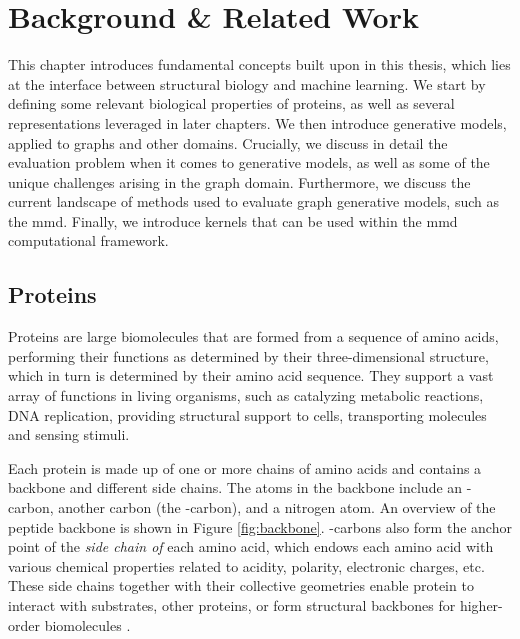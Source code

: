 
\chapter{Background \& Related Work}\label{chap:background}



This chapter introduces fundamental concepts built upon in this thesis, which
lies at the interface between structural biology and machine learning. We start
by defining some relevant biological properties of proteins, as well as several
representations leveraged in later chapters. We then introduce generative
models, applied to graphs and other domains. Crucially, we discuss in detail the
evaluation problem when it comes to generative models, as well as some of the
unique challenges arising in the graph domain. Furthermore, we discuss the
current landscape of methods used to evaluate graph generative models, such as
the \acrfull{mmd}. Finally, we introduce kernels that can be used
within the \acrshort{mmd} computational framework.

\section{Proteins}\label{sec:proteins}

Proteins are large biomolecules that are formed from a sequence of amino acids,
performing their functions as determined by their three-dimensional structure,
which in turn is determined by their amino acid sequence. They support a vast array of
functions in living organisms, such as catalyzing metabolic reactions, DNA
replication, providing structural support to cells, transporting molecules and
sensing stimuli.

Each protein is made up of one or more chains of amino acids and contains a
backbone and different side chains. The atoms in the backbone include an
\textalpha{}-carbon, another carbon (the \textbeta{}-carbon), and a nitrogen
atom. An overview of the peptide backbone is shown in Figure \ref{fig:backbone}.
\textalpha{}-carbons also form the anchor point of the \emph{side chain of} each
amino acid, which endows each amino acid with various chemical properties
related to acidity, polarity, electronic charges, etc. These side chains
together with their collective geometries enable protein to interact with
substrates, other proteins, or form structural backbones for higher-order
biomolecules \citep{o20102}.

